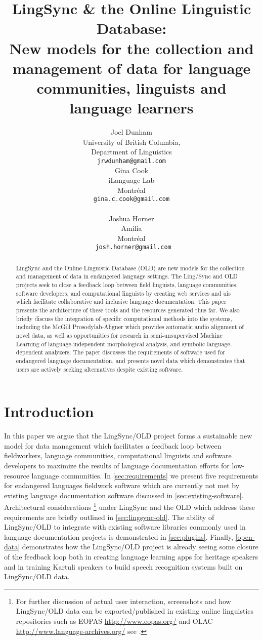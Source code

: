 \documentclass[11pt]{article}
\title{LingSync \& the Online Linguistic Database:\\New models for the
    collection and management of data for language communities, linguists and
language learners}
\author{Joel Dunham \\
University of British Columbia,   \\
Department of Linguistics \\
{\tt jrwdunham@gmail.com} \\\And
Gina Cook \\
iLanguage Lab \\
Montr\'eal \\
{\tt gina.c.cook@gmail.com} \\  \\\And
Joshua Horner \\
Amilia  \\
Montr\'eal \\
{\tt ~josh.horner@gmail.com} \\ }
\date{}
\begin{document}
\maketitle

\begin{abstract}
LingSync and the Online Linguistic Database (OLD) are new models for the
collection and management of data in endangered language settings. The
Ling\-/Sync and OLD projects seek to close a feedback loop  between field
linguists, language communities, software developers, and computational
linguists by creating web services and \glspl{ui} which facilitate
collaborative and inclusive language documentation. This paper presents the
architecture of these tools and the resources generated thus far. We also
briefly discuss the integration of specific computational methods into the
systems, including the McGill Prosodylab-Aligner which provides automatic audio
alignment of novel data, as well as opportunities for research in
semi-unsupervised Machine Learning of language-independent morphological
analysis, and symbolic language-dependent analyzers. The paper discusses the
requirements of software used for endangered language documentation, and
presents novel data which demonstrates that users are actively seeking
alternatives despite existing software.
\end{abstract}


\section{Introduction}

In this paper we argue that the LingSync/OLD project forms a sustainable new
model for data management which facilitates a feedback loop between
fieldworkers, language communities, computational linguists and software
developers to maximize the results of language documentation efforts for
low-resource language communities. In \autoref{sec:requirements} we present
five requirements for endangered languages fieldwork software  which are
currently not met by existing language documentation software discussed in
\autoref{sec:existing-software}. Architectural considerations%
\footnote{For further discussion of actual user interaction, screenshots and
    how LingSync/OLD data can be exported/published in existing online
    linguistics repositories such as EOPAS \url{http://www.eopas.org/} and OLAC
    \url{http://www.language-archives.org/} see \cite{lingsync:2012}.} %
under LingSync and the OLD which address these requirements are briefly
outlined in \autoref{sec:lingsync-old}.  The ability of LingSync/OLD to
integrate with existing software libraries commonly used in language
documentation projects is demonstrated in \autoref{sec:plugins}. Finally,
\autoref{open-data} demonstrates how the LingSync/OLD project is already
seeing some closure of the feedback loop both in creating language learning
apps for heritage speakers and in training Kartuli speakers to build speech
recognition systems built on LingSync/OLD data.
\end{document}
